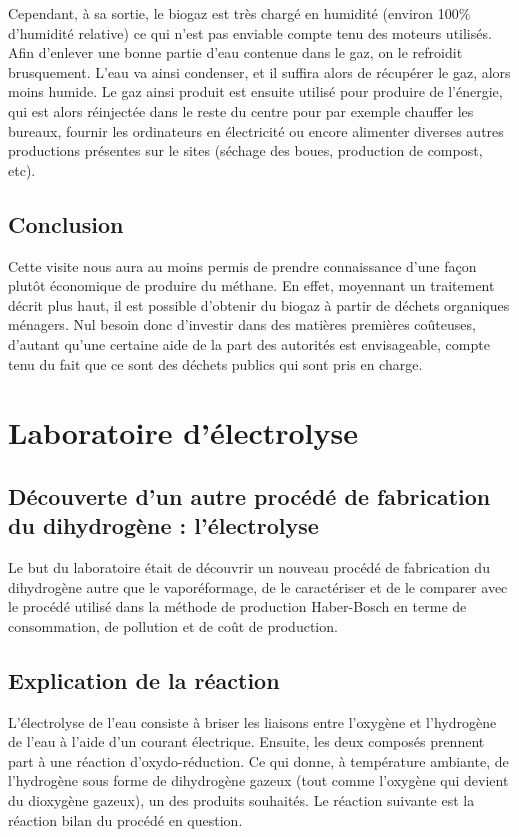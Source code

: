 Cependant, à sa sortie, le biogaz est très chargé en humidité (environ 100\% d’humidité relative) 
ce qui n’est pas enviable compte tenu des moteurs utilisés. Afin d’enlever une bonne partie d’eau contenue 
dans le gaz, on le refroidit brusquement. L’eau va ainsi condenser, et il suffira alors de récupérer 
le gaz, alors moins humide. Le gaz ainsi produit est ensuite utilisé pour produire de l’énergie, 
qui est alors réinjectée dans le reste du centre pour par exemple chauffer les bureaux, 
fournir les ordinateurs en électricité ou encore alimenter diverses autres productions présentes 
sur le sites (séchage des boues, production de compost, etc).

\subsection{Conclusion}
Cette visite nous aura au moins permis de prendre connaissance d’une façon plutôt économique de 
produire du méthane. En effet, moyennant un traitement décrit plus haut, il est possible d’obtenir
du biogaz à partir de déchets organiques ménagers. Nul besoin donc d’investir dans des matières 
premières coûteuses, d’autant qu’une certaine aide de la part des autorités est envisageable, 
compte tenu du fait que ce sont des déchets publics qui sont pris en charge.



\section{Laboratoire d'électrolyse}
\subsection{Découverte d'un autre procédé de fabrication du dihydrogène : l'électrolyse}
Le but du laboratoire était de découvrir un nouveau procédé de
fabrication du dihydrogène autre que le vaporéformage, de le
caractériser et de le comparer avec le procédé utilisé dans la
méthode de production Haber-Bosch en terme de consommation, de
pollution et de coût de production.

\subsection{Explication de la réaction}
L'électrolyse de l'eau consiste à briser les liaisons entre
l'oxygène et l'hydrogène de l'eau à l'aide d'un courant électrique.
Ensuite, les deux composés prennent part à une réaction d'oxydo-réduction.
Ce qui donne, à température ambiante, de l'hydrogène sous forme de
dihydrogène gazeux (tout comme l'oxygène qui devient du dioxygène gazeux),
un des produits souhaités. Le réaction suivante est la réaction bilan du
procédé en question.

